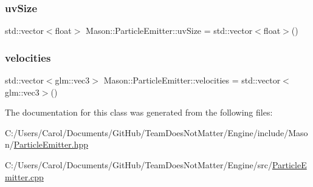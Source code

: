 \hypertarget{class_mason_1_1_particle_emitter_a9c2a9f3d9c113d2503598551c992fde4}{}\label{class_mason_1_1_particle_emitter_a9c2a9f3d9c113d2503598551c992fde4} 
\subsubsection{\texorpdfstring{uv\+Size}{uvSize}}
{\footnotesize\ttfamily std\+::vector$<$float$>$ Mason\+::\+Particle\+Emitter\+::uv\+Size = std\+::vector$<$float$>$()\hspace{0.3cm}{\ttfamily [protected]}}

\hypertarget{class_mason_1_1_particle_emitter_aa72403d590c4528e1a1d9dbf4bc3dfd3}{}\label{class_mason_1_1_particle_emitter_aa72403d590c4528e1a1d9dbf4bc3dfd3} 
\subsubsection{\texorpdfstring{velocities}{velocities}}
{\footnotesize\ttfamily std\+::vector$<$glm\+::vec3$>$ Mason\+::\+Particle\+Emitter\+::velocities = std\+::vector$<$glm\+::vec3$>$()\hspace{0.3cm}{\ttfamily [protected]}}



The documentation for this class was generated from the following files\+:\begin{DoxyCompactItemize}
\item 
C\+:/\+Users/\+Carol/\+Documents/\+Git\+Hub/\+Team\+Does\+Not\+Matter/\+Engine/include/\+Mason/\hyperlink{_particle_emitter_8hpp}{Particle\+Emitter.\+hpp}\item 
C\+:/\+Users/\+Carol/\+Documents/\+Git\+Hub/\+Team\+Does\+Not\+Matter/\+Engine/src/\hyperlink{_particle_emitter_8cpp}{Particle\+Emitter.\+cpp}\end{DoxyCompactItemize}
